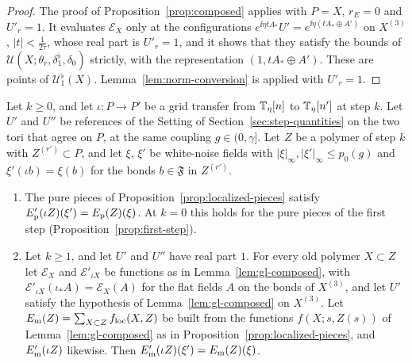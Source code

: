 \begin{proof}
The proof of Proposition~\ref{prop:composed} applies with $P=X$, $r_E=0$ and $U'_r=1$. It evaluates $\mathcal E_X$ only at the configurations $e^{\ii\eta tA_*}U'=e^{\ii\eta(tA_*\oplus A')}$ on $X^{(3)}$, $|t|<\frac1{2\tau}$, whose real part is $U'_r=1$, and it shows that they satisfy the bounds of $\mathcal U(X;\theta_r,\delta_1^\flat,\delta_0)$ strictly, with the representation $(1,tA_*\oplus A')$. These are points of $\mathcal U^\flat_1(X)$. Lemma~\ref{lem:norm-conversion} is applied with $U'_r=1$.
\end{proof}

\begin{lemma}\label{lem:gl-pieces}
Let $k\ge0$, and let $\iota:P\to P'$ be a grid transfer from $\mathbb T_\eta[n]$ to $\mathbb T_\eta[n']$ at step $k$. Let $U'$ and $U''$ be references of the Setting of Section~\ref{sec:step-quantities} on the two tori that agree on $P$, at the same coupling $g\in(0,\gamma]$. Let $Z$ be a polymer of step $k$ with $Z^{(r')}\subset P$, and let $\xi$, $\xi'$ be white-noise fields with $|\xi|_\infty,|\xi'|_\infty\le p_0(g)$ and $\xi'(\iota b)=\xi(b)$ for the bonds $b\in\mathfrak F$ in $Z^{(r')}$.
\begin{enumerate}[label=(\alph*)]
\item The pure pieces of Proposition~\ref{prop:localized-pieces} satisfy $E'_{\rm p}(\iota Z)(\xi')=E_{\rm p}(Z)(\xi)$. At $k=0$ this holds for the pure pieces of the first step (Proposition~\ref{prop:first-step}).
\item Let $k\ge1$, and let $U'$ and $U''$ have real part $1$. For every old polymer $X\subset Z$ let $\mathcal E_X$ and $\mathcal E'_{\iota X}$ be functions as in Lemma~\ref{lem:gl-composed}, with $\mathcal E'_{\iota X}(\iota_*A)=\mathcal E_X(A)$ for the flat fields $A$ on the bonds of $X^{(3)}$, and let $U'$ satisfy the hypothesis of Lemma~\ref{lem:gl-composed} on $X^{(3)}$. Let $E_{\rm m}(Z)=\sum_{X\subset Z}f_{\rm loc}(X,Z)$ be built from the functions $f(X;s,Z(s))$ of Lemma~\ref{lem:gl-composed} as in Proposition~\ref{prop:localized-pieces}, and $E'_{\rm m}(\iota Z)$ likewise. Then $E'_{\rm m}(\iota Z)(\xi')=E_{\rm m}(Z)(\xi)$.
\end{enumerate}
\end{lemma}

